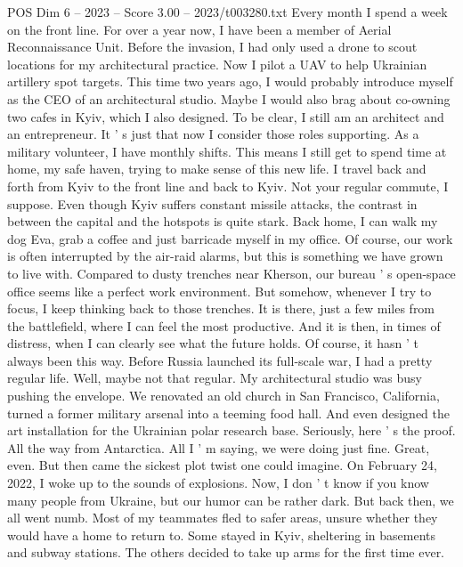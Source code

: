 \begin{textsample}{POS Dim 6 – 2023 – Score 3.00 – 2023/t003280.txt}  \label{ex:f6_pos_072}
Every month I spend a week on the front line.
For over a year now, I have been a member of Aerial Reconnaissance Unit.
Before the invasion, I had only used a drone to scout locations for my architectural practice.
Now I pilot a UAV to help Ukrainian artillery spot targets.
This time two years ago, I would probably introduce myself as the CEO of an architectural studio.
Maybe I would also brag about co-owning two cafes in Kyiv, which I also designed.
To be clear, I still am an architect and an entrepreneur.
It ' s just that now I consider those roles supporting.
As a military volunteer, I have monthly shifts.
This means I still get to spend time at home, my safe haven, trying to make sense of this new life.
I travel back and forth from Kyiv to the front line and back to Kyiv.
Not your regular commute, I suppose.
Even though Kyiv suffers constant missile attacks, the contrast in between the capital and the hotspots is quite stark.
Back home, I can walk my dog Eva, grab a coffee and just barricade myself in my office.
Of course, our work is often interrupted by the air-raid alarms, but this is something we have grown to live with.
Compared to dusty trenches near Kherson, our bureau ' s open-space office seems like a perfect work environment.
But somehow, whenever I try to focus, I keep thinking back to those trenches.
It is there, just a few miles from the battlefield, where I can feel the most productive.
And it is then, in times of distress, when I can clearly see what the future holds.
Of course, it hasn ' t always been this way.
Before Russia launched its full-scale war, I had a pretty regular life.
Well, maybe not that regular.
My architectural studio was busy pushing the envelope.
We renovated an old church in San Francisco, California, turned a former military arsenal into a teeming food hall.
And even designed the art installation for the Ukrainian polar research base.
Seriously, here ' s the proof.
All the way from Antarctica.
All I ' m saying, we were doing just fine.
Great, even.
But then came the sickest plot twist one could imagine.
On February 24, 2022, I woke up to the sounds of explosions.
Now, I don ' t know if you know many people from Ukraine, but our humor can be rather dark.
But back then, we all went numb.
Most of my teammates fled to safer areas, unsure whether they would have a home to return to.
Some stayed in Kyiv, sheltering in basements and subway stations.
The others decided to take up arms for the first time ever.

\end{textsample}

